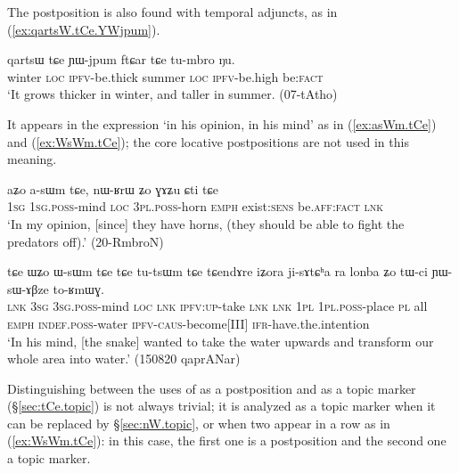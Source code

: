 The postposition  is also found with temporal adjuncts, as in (\ref{ex:qartsW.tCe.YWjpum}).

\begin{exe}
\ex \label{ex:qartsW.tCe.YWjpum}
\gll qartsɯ tɕe ɲɯ-jpum ftɕar tɕe tu-mbro ŋu. \\
winter \textsc{loc} \textsc{ipfv}-be.thick summer \textsc{loc} \textsc{ipfv}-be.high be:\textsc{fact} \\
\glt `It grows thicker in winter, and taller in summer. (07-tAtho) 
\end{exe}

It appears in the expression  `in his opinion, in his mind' as in (\ref{ex:asWm.tCe}) and (\ref{ex:WsWm.tCe}); the core locative postpositions are not used in this meaning.

\begin{exe}
\ex \label{ex:asWm.tCe}
\gll aʑo a-sɯm tɕe, nɯ-ʁrɯ ʑo ɣɤʑu ɕti tɕe \\
\textsc{1sg} \textsc{1sg}.\textsc{poss}-mind \textsc{loc} \textsc{3pl}.\textsc{poss}-horn \textsc{emph} exist:\textsc{sens} be.\textsc{aff}:\textsc{fact} \textsc{lnk} \\
\glt `In my opinion, [since] they have horns, (they should be able to fight the predators off).' (20-RmbroN)
\end{exe}


\begin{exe}
\ex \label{ex:WsWm.tCe}
\gll tɕe ɯʑo ɯ-sɯm tɕe tɕe tu-tsɯm tɕe tɕendɤre iʑora ji-sɤtɕʰa ra lonba ʑo tɯ-ci ɲɯ-sɯ-ɤβze to-ʁmɯɣ. \\
\textsc{lnk} \textsc{3sg} \textsc{3sg}.\textsc{poss}-mind \textsc{loc} \textsc{lnk} \textsc{ipfv}:\textsc{up}-take \textsc{lnk} \textsc{lnk} \textsc{1pl} \textsc{1pl}.\textsc{poss}-place \textsc{pl} all \textsc{emph} \textsc{indef}.\textsc{poss}-water \textsc{ipfv}-\textsc{caus}-become[III] \textsc{ifr}-have.the.intention \\
\glt `In his mind, [the snake] wanted to take the water upwards and transform our whole area into water.' (150820 qaprANar)
\end{exe} 

Distinguishing between the uses of  as a postposition and as a topic marker (§\ref{sec:tCe.topic}) is not always trivial; it is analyzed as a topic marker when it can be replaced by  §\ref{sec:nW.topic}, or when two  appear in a row as in (\ref{ex:WsWm.tCe}): in this case, the first one is a postposition and the second one a topic marker.


